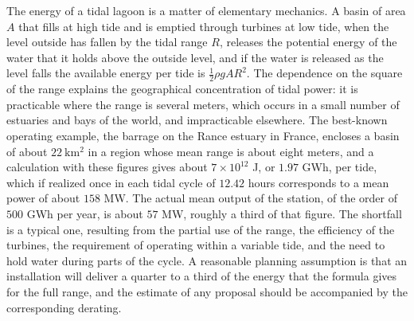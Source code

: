 The energy of a tidal lagoon is a matter of elementary mechanics. A basin of area $A$ that fills at high tide and is emptied through turbines at low tide, when the level outside has fallen by the tidal range $R$, releases the potential energy of the water that it holds above the outside level, and if the water is released as the level falls the available energy per tide is $\tfrac12\rho gAR^2$. The dependence on the square of the range explains the geographical concentration of tidal power: it is practicable where the range is several meters, which occurs in a small number of estuaries and bays of the world, and impracticable elsewhere. The best-known operating example, the barrage on the Rance estuary in France, encloses a basin of about $22\ \mathrm{km^2}$ in a region whose mean range is about eight meters, and a calculation with these figures gives about $7\times10^{12}$ J, or $1.97$ GWh, per tide, which if realized once in each tidal cycle of $12.42$ hours corresponds to a mean power of about $158$ MW. The actual mean output of the station, of the order of $500$ GWh per year, is about $57$ MW, roughly a third of that figure. The shortfall is a typical one, resulting from the partial use of the range, the efficiency of the turbines, the requirement of operating within a variable tide, and the need to hold water during parts of the cycle. A reasonable planning assumption is that an installation will deliver a quarter to a third of the energy that the formula gives for the full range, and the estimate of any proposal should be accompanied by the corresponding derating.

